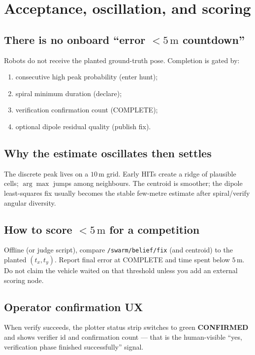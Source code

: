 \chapter{Acceptance, oscillation, and scoring}
\label{ch:accept}

\section{There is no onboard ``error $<5\,\mathrm{m}$ countdown''}
Robots do not receive the planted ground-truth pose. Completion is gated by:
\begin{enumerate}[leftmargin=*]
  \item consecutive high peak probability (enter hunt);
  \item spiral minimum duration (declare);
  \item verification confirmation count (COMPLETE);
  \item optional dipole residual quality (publish fix).
\end{enumerate}

\section{Why the estimate oscillates then settles}
The discrete peak lives on a \(10\,\mathrm{m}\) grid. Early HITs create a ridge
of plausible cells; \(\arg\max\) jumps among neighbours. The centroid is
smoother; the dipole least-squares fix usually becomes the stable few-metre
estimate after spiral/verify angular diversity.

\section{How to score $<5\,\mathrm{m}$ for a competition}
Offline (or judge script), compare
\texttt{/swarm/belief/fix} (and centroid) to the planted
\((t_x,t_y)\). Report final error at COMPLETE and time spent below
\(5\,\mathrm{m}\). Do not claim the vehicle waited on that threshold unless you
add an external scoring node.

\section{Operator confirmation UX}
When verify succeeds, the plotter status strip switches to green
\textbf{CONFIRMED} and shows verifier id and confirmation count --- that is the
human-visible ``yes, verification phase finished successfully'' signal.
